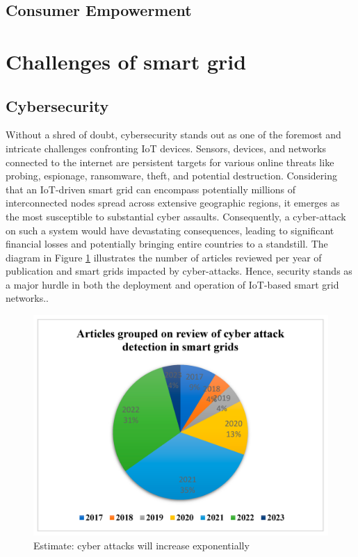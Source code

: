 \subsection{Consumer Empowerment}
\section{Challenges of smart grid }  
\subsection{Cybersecurity}
Without a shred of doubt, cybersecurity stands out as one of the foremost and intricate challenges confronting IoT devices. Sensors, devices, and networks connected to the internet are persistent targets for various online threats like probing, espionage, ransomware, theft, and potential destruction. Considering that an IoT-driven smart grid can encompass potentially millions of interconnected nodes spread across extensive geographic regions, it emerges as the most susceptible to substantial cyber assaults. Consequently, a cyber-attack on such a system would have devastating consequences, leading to significant financial losses and potentially bringing entire countries to a standstill. The diagram in Figure \ref{fig:attacks} illustrates the number of articles reviewed per year of publication and smart grids impacted by cyber-attacks. Hence, security stands as a major hurdle in both the deployment and operation of IoT-based smart grid networks.\cite{kimani2019cyber}.
\begin{figure}[h]
	\centering
	\includegraphics[width=12cm]{figures/attack.png}
	\caption{Estimate: cyber attacks will increase exponentially \cite{mdpi-link}}
	\label{fig:attacks}
\end{figure}
\newpage

